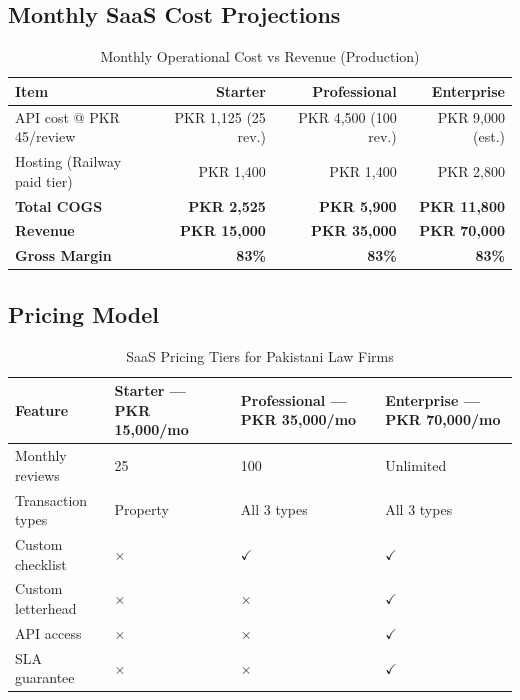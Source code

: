 \documentclass[12pt, a4paper]{article}
\begin{document}
\subsection{Monthly SaaS Cost Projections}

\begin{table}[H]
\centering
\caption{Monthly Operational Cost vs Revenue (Production)}
\renewcommand{\arraystretch}{1.3}
\begin{tabularx}{\textwidth}{Xrrr}
\toprule
\textbf{Item}
    & \textbf{Starter}
    & \textbf{Professional}
    & \textbf{Enterprise} \\
\midrule
API cost @ PKR 45/review
    & PKR 1,125 (25 rev.)
    & PKR 4,500 (100 rev.)
    & PKR 9,000 (est.) \\
Hosting (Railway paid tier)
    & PKR 1,400
    & PKR 1,400
    & PKR 2,800 \\
\textbf{Total COGS}
    & \textbf{PKR 2,525}
    & \textbf{PKR 5,900}
    & \textbf{PKR 11,800} \\
\midrule
\textbf{Revenue}
    & \textbf{PKR 15,000}
    & \textbf{PKR 35,000}
    & \textbf{PKR 70,000} \\
\textbf{Gross Margin}
    & \textbf{83\%}
    & \textbf{83\%}
    & \textbf{83\%} \\
\bottomrule
\end{tabularx}
\label{tab:projections}
\end{table}

\subsection{Pricing Model}

\begin{table}[H]
\centering
\caption{SaaS Pricing Tiers for Pakistani Law Firms}
\renewcommand{\arraystretch}{1.3}
\begin{tabularx}{\textwidth}{lXXX}
\toprule
\textbf{Feature}
    & \textbf{Starter --- PKR 15,000/mo}
    & \textbf{Professional --- PKR 35,000/mo}
    & \textbf{Enterprise --- PKR 70,000/mo} \\
\midrule
Monthly reviews     & 25          & 100              & Unlimited \\
Transaction types   & Property    & All 3 types      & All 3 types \\
Custom checklist    & $\times$    & $\checkmark$     & $\checkmark$ \\
Custom letterhead   & $\times$    & $\times$         & $\checkmark$ \\
API access          & $\times$    & $\times$         & $\checkmark$ \\
SLA guarantee       & $\times$    & $\times$         & $\checkmark$ \\
\bottomrule
\end{tabularx}
\label{tab:pricing}
\end{table}
\end{document}
